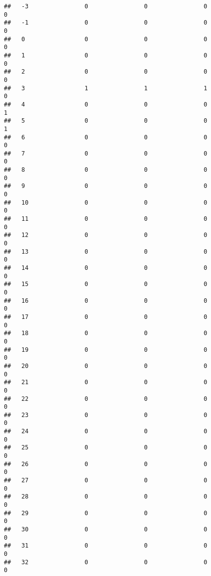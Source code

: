 \documentclass[]{article}
\begin{document}
\begin{verbatim}
##   -3                0                0                0                0
##   -1                0                0                0                0
##   0                 0                0                0                0
##   1                 0                0                0                0
##   2                 0                0                0                0
##   3                 1                1                1                0
##   4                 0                0                0                1
##   5                 0                0                0                1
##   6                 0                0                0                0
##   7                 0                0                0                0
##   8                 0                0                0                0
##   9                 0                0                0                0
##   10                0                0                0                0
##   11                0                0                0                0
##   12                0                0                0                0
##   13                0                0                0                0
##   14                0                0                0                0
##   15                0                0                0                0
##   16                0                0                0                0
##   17                0                0                0                0
##   18                0                0                0                0
##   19                0                0                0                0
##   20                0                0                0                0
##   21                0                0                0                0
##   22                0                0                0                0
##   23                0                0                0                0
##   24                0                0                0                0
##   25                0                0                0                0
##   26                0                0                0                0
##   27                0                0                0                0
##   28                0                0                0                0
##   29                0                0                0                0
##   30                0                0                0                0
##   31                0                0                0                0
##   32                0                0                0                0

\end{verbatim}
\end{document}
